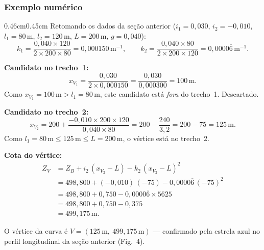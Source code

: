 \documentclass[12pt,letterpaper]{article}
\newenvironment{corpo}{\begin{adjustwidth}{0.46cm}{0.45cm}\justifying}{\end{adjustwidth}}
\begin{document}
\subsubsection*{Exemplo numérico}

\begin{corpo}
Retomando os dados da seção anterior ($i_1=0{,}030$, $i_2=-0{,}010$, $l_1=80\,\text{m}$, $l_2=120\,\text{m}$, $L=200\,\text{m}$, $g=0{,}040$):
\[
 k_1 = \frac{0{,}040 \times 120}{2 \times 200 \times 80} = 0{,}000150\,\text{m}^{-1}, \qquad
 k_2 = \frac{0{,}040 \times 80}{2 \times 200 \times 120} = 0{,}0000\overline{6}\,\text{m}^{-1}.
\]

\textbf{Candidato no trecho~1:}
\[
 x_{V_1} = \frac{0{,}030}{2 \times 0{,}000150} = \frac{0{,}030}{0{,}000300} = 100\,\text{m}.
\]
Como $x_{V_1} = 100\,\text{m} > l_1 = 80\,\text{m}$, este candidato está \emph{fora} do trecho~1. Descartado.

\textbf{Candidato no trecho~2:}
\[
 x_{V_2} = 200 + \frac{-0{,}010 \times 200 \times 120}{0{,}040 \times 80}
          = 200 - \frac{240}{3{,}2}
          = 200 - 75
          = 125\,\text{m}.
\]
Como $l_1 = 80\,\text{m} \le 125\,\text{m} \le L = 200\,\text{m}$, o vértice está no trecho~2. \checkmark

\textbf{Cota do vértice:}
\[
\begin{aligned}
Z_V &= Z_B + i_2\,(x_{V_2}-L) - k_2\,(x_{V_2}-L)^2 \\
    &= 498{,}800 + (-0{,}010)\,(-75) - 0{,}0000\overline{6}\,(-75)^2 \\
    &= 498{,}800 + 0{,}750 - 0{,}0000\overline{6} \times 5625 \\
    &= 498{,}800 + 0{,}750 - 0{,}375 \\
    &= 499{,}175\,\text{m}.
\end{aligned}
\]

O vértice da curva é $V = (125\,\text{m},\ 499{,}175\,\text{m})$ --- confirmado pela estrela azul no perfil longitudinal da seção anterior (Fig.~4).
\end{corpo}
\end{document}
